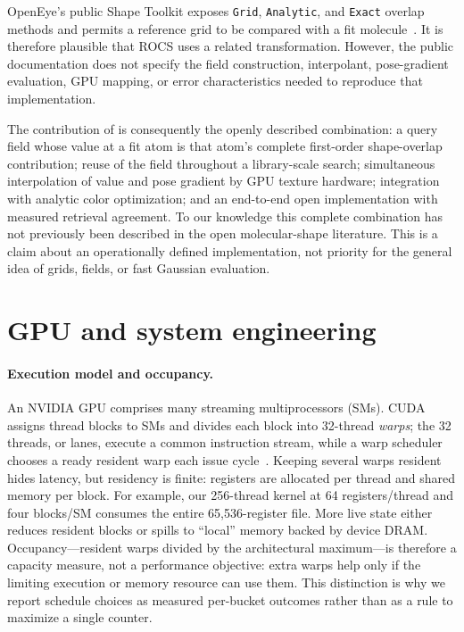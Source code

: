 OpenEye's public Shape Toolkit exposes \texttt{Grid}, \texttt{Analytic}, and
\texttt{Exact} overlap methods and permits a reference grid to be compared with
a fit molecule~\citep{openeyeShapeTheory}. It is therefore plausible that ROCS
uses a related transformation. However, the public documentation does not
specify the field construction, interpolant, pose-gradient evaluation, GPU
mapping, or error characteristics needed to reproduce that implementation.

The contribution of \method{} is consequently the openly described
combination: a query field whose value at a fit atom is that atom's complete
first-order shape-overlap contribution; reuse of the field throughout a
library-scale search; simultaneous interpolation of value and pose gradient by
GPU texture hardware; integration with analytic color optimization; and an
end-to-end open implementation with measured retrieval agreement. To our
knowledge this complete combination has not previously been described in the
open molecular-shape literature. This is a claim about an operationally defined
implementation, not priority for the general idea of grids, fields, or fast
Gaussian evaluation.

\section{GPU and system engineering}

\paragraph{Execution model and occupancy.}
\label{sec:gpumodel}
An NVIDIA GPU comprises many streaming multiprocessors (SMs). CUDA assigns
thread blocks to SMs and divides each block into 32-thread \emph{warps}; the 32
threads, or lanes, execute a common instruction stream, while a warp scheduler
chooses a ready resident warp each issue cycle~\citep{nvidia2026cuda}. Keeping
several warps resident hides latency, but residency is finite: registers are
allocated per thread and shared memory per block. For example, our 256-thread
kernel at 64 registers/thread and four blocks/SM consumes the entire
65,536-register file. More live state either reduces resident blocks or spills
to ``local'' memory backed by device DRAM. Occupancy---resident warps divided by
the architectural maximum---is therefore a capacity measure, not a performance
objective: extra warps help only if the limiting execution or memory resource
can use them. This distinction is why we report schedule choices as measured
per-bucket outcomes rather than as a rule to maximize a single counter.

